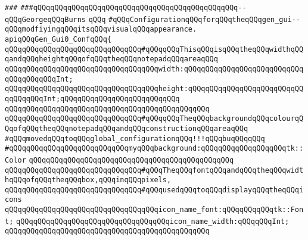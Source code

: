 \verb|###|\newline
\verb|###qQQqqQQqqQQqqQQqqQQqqQQqqQQqqQQqqQQqqQQqqQQqqQQq--qQQqGeorgeqQQqBurns|\newline
\newline
\newline
\newline
\newline
\verb|qQQq|\newline
\verb|#qQQqConfigurationqQQqforqQQqtheqQQqgen_gui--qQQqmodfiyingqQQqitsqQQqvisualqQQqappearance.|\newline
\newline
\newline
\verb|apiqQQqGen_Gui0_ConfqQQq{|\newline
\newline
\verb|qQQqqQQqqQQqqQQqqQQqqQQqqQQqqQQq#qQQqqQQqThisqQQqisqQQqtheqQQqwidthqQQqandqQQqheightqQQqofqQQqtheqQQqnotepadqQQqareaqQQq|\newline
\verb|qQQqqQQqqQQqqQQqqQQqqQQqqQQqqQQqqQQqwidth:qQQqqQQqqQQqqQQqqQQqqQQqqQQqqQQqqQQqqQQqInt;|\newline
\verb|qQQqqQQqqQQqqQQqqQQqqQQqqQQqqQQqqQQqheight:qQQqqQQqqQQqqQQqqQQqqQQqqQQqqQQqqQQqInt;qQQqqQQqqQQqqQQqqQQqqQQqqQQq|\newline
\verb|qQQqqQQqqQQqqQQqqQQqqQQqqQQqqQQqqQQqqQQqqQQqqQQq|\newline
\verb|qQQqqQQqqQQqqQQqqQQqqQQqqQQqqQQq#qQQqqQQqTheqQQqbackgroundqQQqcolourqQQqofqQQqtheqQQqnotepadqQQqandqQQqconstructionqQQqareaqQQq|\newline
\newline
\verb|#qQQqmovedqQQqtoqQQqglobal_configurationqQQq!!!qQQqbuqQQqqQQq|\newline
\verb|#qQQqqQQqqQQqqQQqqQQqqQQqqQQqmyqQQqbackground:qQQqqQQqqQQqqQQqqQQqtk::Color|\newline
\newline
\verb|qQQqqQQqqQQqqQQqqQQqqQQqqQQqqQQqqQQqqQQqqQQqqQQq|\newline
\verb|qQQqqQQqqQQqqQQqqQQqqQQqqQQqqQQq#qQQqTheqQQqfontqQQqandqQQqtheqQQqwidthqQQqofqQQqtheqQQqbox,qQQqinqQQqpixels,|\newline
\verb|qQQqqQQqqQQqqQQqqQQqqQQqqQQqqQQq#qQQqusedqQQqtoqQQqdisplayqQQqtheqQQqicons|\newline
\verb|qQQqqQQqqQQqqQQqqQQqqQQqqQQqqQQqqQQqicon_name_font:qQQqqQQqqQQqtk::Font;|\newline
\verb|qQQqqQQqqQQqqQQqqQQqqQQqqQQqqQQqqQQqicon_name_width:qQQqqQQqInt;|\newline
\verb|qQQqqQQqqQQqqQQqqQQqqQQqqQQqqQQqqQQqqQQqqQQqqQQq|\newline
